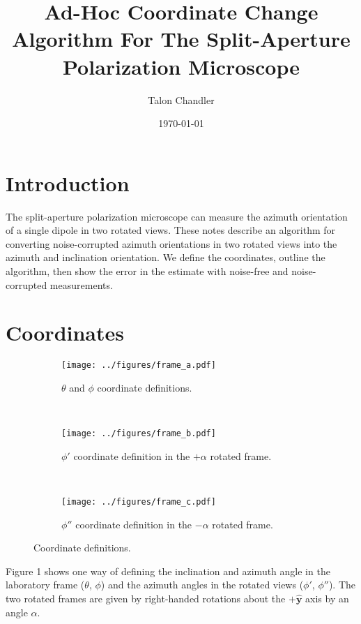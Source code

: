 \documentclass[11pt]{article}
\providecommand{\mh}[1]{\mathbf{\hat{#1}}}
\begin{document}
\title{\vspace{-2.5em} Ad-Hoc Coordinate Change Algorithm For The Split-Aperture\\
  Polarization Microscope \vspace{-1em}} \author{Talon
  Chandler}%
\date{\vspace{-1em}\today\vspace{-1em}}
\maketitle
\section{Introduction}
The split-aperture polarization microscope can measure the azimuth orientation
of a single dipole in two rotated views. These notes describe an algorithm for
converting noise-corrupted azimuth orientations in two rotated views into the
azimuth and inclination orientation. We define the coordinates, outline the
algorithm, then show the error in the estimate with noise-free and noise-corrupted
measurements.

\section{Coordinates}
\begin{figure*}[h]
 \captionsetup{width=1.0\linewidth}
 \centering
 \begin{subfigure}[t]{0.33\textwidth}
   \centering
   \texttt{[image: ../figures/frame\_a.pdf]}
   \caption{$\theta$ and $\phi$ coordinate definitions.}
   \label{fig:frames_a}
 \end{subfigure}%
 ~
 \begin{subfigure}[t]{0.33\textwidth}
   \centering
   \texttt{[image: ../figures/frame\_b.pdf]}
   \caption{$\phi'$ coordinate definition in the $+\alpha$ rotated frame.}
   \label{fig:frames_b}
 \end{subfigure}%
 ~
 \begin{subfigure}[t]{0.33\textwidth}
   \centering
   \texttt{[image: ../figures/frame\_c.pdf]}
   \caption{$\phi''$ coordinate definition in the $-\alpha$ rotated frame.}
   \label{fig:frames_c}
 \end{subfigure}%
 \caption{Coordinate definitions.}
 \label{fig:frames}
\end{figure*}

Figure 1 shows one way of defining the inclination and azimuth angle in the
laboratory frame ($\theta$, $\phi$) and the azimuth angles in the rotated views
($\phi'$, $\phi''$). The two rotated frames are given by right-handed rotations
about the $+\mh{y}$ axis by an angle $\alpha$.
\end{document}
